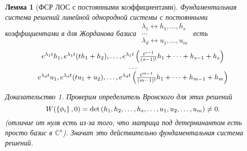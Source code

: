 \documentclass[a5paper, 10pt]{article}
\theoremstyle{definition}
\theoremstyle{plain}
\newtheorem{Lem}{Лемма}
\theoremstyle{remark}
\newtheorem*{Proof}{Доказательство}
\begin{document}
	\begin{Lem}[ФСР ЛОС с постоянными коэффициентами]\label{Lem:FSR}
		Фундаментальная система решений линейной однородной системы с постоянными коэффициентами в для Жорданова базиса $\begin{matrix}
			\lambda_1 \leftrightarrow h_1, \dots, h_s\\
			\dots \\
			\lambda_d  \leftrightarrow u_1, \dots, u_m
		\end{matrix}$ 
		есть \[\begin{matrix}
			e^{\lambda_1 t}h_1, e^{\lambda_1 t} (th_1+h_2), \dots, e^{\lambda_1 t} \left(\frac{t^{s-1}}{(s-1)!} h_1 + \dots + h_{s-1} + h_s\right)\\
			\dots \\
			e^{\lambda_d t}u_1, e^{\lambda_d t} (tu_1+u_2), \dots, e^{\lambda_d t} \left(\frac{t^{m-1}}{(m-1)!} h_1 + \dots + h_{m-1} + h_m\right)
		\end{matrix}\] 
	\begin{Proof}
		Проверим определитель Вронского для этих решений
		\[
		W(\left\{\phi_i\right\},0) = \det \left(h_1, h_2, \dots, h_s, \dots, u_1, u_2, \dots, u_m\right) \neq 0.
		\]
		(отличие от нуля есть из-за того, что матрица под детерминантом есть просто базис в $\mathbb{C}^n$).
		Значит это действительно фундаментальная система решений.
	\end{Proof}
	\end{Lem}
	
\end{document}
